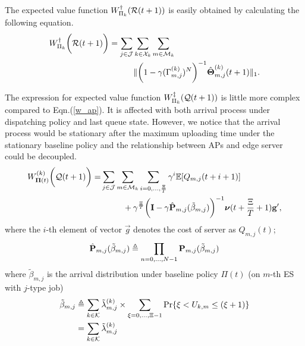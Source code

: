 The expected value function $W^{\dagger}_{\Pi_{k}}(\mathcal{R}(t+1))$ is easily obtained by calculating the following equation.
\begin{align}
    W^{\dagger}_{\Pi_{k}}\bigg(\mathcal{R}(t+1)\bigg) = \sum_{j\in\mathcal{J}}&\sum_{k\in\mathcal{X}_{k}}\sum_{m\in\mathcal{M}_{k}}
    \nonumber\\
    &\lVert
        \bigg( 1 - \gamma ({\Gamma}^{(k)}_{m,j})^{N} \bigg)^{-1} \hat{\boldsymbol{\Theta}}^{(k)}_{m,j}(t+1)
    \|_1.
    \label{w_ap}
\end{align}

The expression for expected value function $W^{\ddagger}_{\Pi_{k}}(\mathcal{Q}(t+1))$ is little more complex compared to Eqn.(\ref{w_ap}).
It is affected with both arrival process under dispatching policy and last queue state.
However, we notice that the arrival process would be stationary after the maximum uploading time under the stationary baseline policy and the relationship between APs and edge server could be decoupled.
\begin{align}
    W^{(k)}_{\boldsymbol{\Pi}(t)}\bigg(\mathcal{Q}(t+1)\bigg)
    =& \sum_{j\in\mathcal{J}}\sum_{m\in\mathcal{M}_{k}}\sum_{i=0,\dots,\frac{\Xi}{T}} \gamma^{i} \mathbb{E}[ Q_{m,j}({t+i+1}) ]
    \nonumber\\
    &~~~~~~~~+ \gamma^{\frac{\Xi}{T}} \bigg( \mathbf{I} - \gamma \hat{\mathbf{P}}_{m,j}(\tilde{\beta}_{m,j}) \bigg)^{-1} \boldsymbol{\nu}({t+\frac{\Xi}{T}+1}) \mathbf{g}',
\end{align}
where the $i$-th element of vector $\vec{g}$ denotes the cost of server as $Q_{m,j}(t)$;
\begin{align}
    \hat{\mathbf{P}}_{m,j}(\tilde{\beta}_{m,j}) \triangleq \prod_{n=0,\dots,N-1} \mathbf{P}_{m,j}(\tilde{\beta}_{m,j})
\end{align}
where $\tilde{\beta}_{m,j}$ is the arrival distribution under baseline policy $\Pi(t)$ (on $m$-th ES with $j$-type job)
\begin{align}
    \tilde{\beta}_{m,j} &\triangleq \sum_{k\in\mathcal{K}} \tilde{\lambda}^{(k)}_{m,j} \times \sum_{\xi=0,\dots,\Xi-1} \Pr\{ \xi<U_{k,m}\leq(\xi+1) \}
        \nonumber\\
    ~~~~&= \sum_{k\in\mathcal{K}} \tilde{\lambda}^{(k)}_{m,j}
\end{align}

